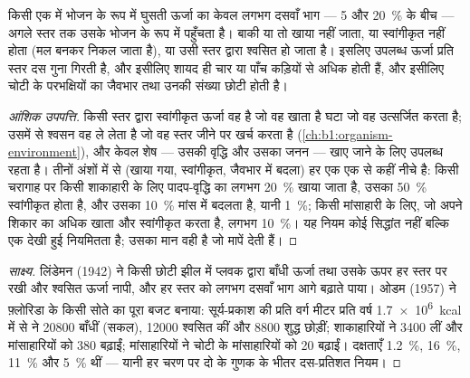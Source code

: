 \begin{theorem}[दस-प्रतिशत नियम]\label{thm:b1:ecosystem-organization:lindeman}
किसी एक  में भोजन के रूप में घुसती ऊर्जा का केवल लगभग दसवाँ भाग
--- \qty{5}{} और \qty{20}{\%} के बीच --- अगले स्तर तक उसके भोजन के रूप
में पहुँचता है। बाकी या तो खाया नहीं जाता, या स्वांगीकृत नहीं होता (मल
बनकर निकल जाता है), या उसी स्तर द्वारा श्वसित हो जाता है। इसलिए उपलब्ध
ऊर्जा प्रति स्तर दस गुना गिरती है, और इसीलिए  शायद ही चार
या पाँच कड़ियों से अधिक होती हैं, और इसीलिए चोटी के परभक्षियों का जैवभार
तथा उनकी संख्या छोटी होती है।
\end{theorem}
\begin{proof}[आंशिक उपपत्ति]
किसी स्तर द्वारा स्वांगीकृत ऊर्जा वह है जो वह खाता है घटा जो वह उत्सर्जित
करता है; उसमें से श्वसन वह ले लेता है जो वह स्तर जीने पर खर्च करता है
(\cref{ch:b1:organism-environment}), और केवल शेष --- उसकी वृद्धि और उसका
जनन --- खाए जाने के लिए उपलब्ध रहता है। तीनों अंशों में से (खाया गया,
स्वांगीकृत, जैवभार में बदला) हर एक एक से कहीं नीचे है: किसी चरागाह पर
किसी शाकाहारी के लिए पादप-वृद्धि का लगभग \qty{20}{\%} खाया जाता है,
उसका \qty{50}{\%} स्वांगीकृत होता है, और उसका \qty{10}{\%} मांस में
बदलता है, यानी \qty{1}{\%}; किसी मांसाहारी के लिए, जो अपने शिकार का
अधिक खाता और स्वांगीकृत करता है, लगभग \qty{10}{\%}। यह नियम कोई
सिद्धांत नहीं बल्कि एक देखी हुई नियमितता है; उसका मान वही है जो मापें
देती हैं।
\end{proof}
\begin{proof}[साक्ष्य]
लिंडेमन (1942) ने किसी छोटी झील में प्लवक द्वारा बाँधी ऊर्जा तथा उसके
ऊपर हर स्तर पर रखी और श्वसित ऊर्जा नापी, और हर स्तर को लगभग दसवाँ भाग
आगे बढ़ाते पाया। ओडम (1957) ने फ़्लोरिडा के किसी सोते का पूरा बजट बनाया:
सूर्य-प्रकाश की प्रति वर्ग मीटर प्रति वर्ष \qty{1.7e6}{kcal} में से
 ने \num{20800} बाँधीं (सकल), \num{12000} श्वसित कीं और
\num{8800} शुद्ध छोड़ीं; शाकाहारियों ने \num{3400} लीं और मांसाहारियों
को \num{380} बढ़ाईं; मांसाहारियों ने चोटी के मांसाहारियों को \num{20}
बढ़ाईं। दक्षताएँ \qty{1.2}{\%}, \qty{16}{\%}, \qty{11}{\%} और
\qty{5}{\%} थीं --- यानी हर चरण पर दो के गुणक के भीतर दस-प्रतिशत नियम।
\end{proof}


